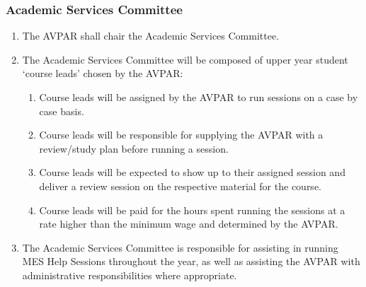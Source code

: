 \subsubsection{Academic Services Committee}
\label{academic-services-committee}
\begin{enumerate}
 \item
  The AVPAR shall chair the Academic Services Committee.
 \item
  The Academic Services Committee will be composed of upper year student
  `course leads' chosen by the AVPAR:

  \begin{enumerate}
   \item
    Course leads will be assigned by the AVPAR to run sessions on a case
    by case basis.
   \item
    Course leads will be responsible for supplying the AVPAR with a
    review/study plan before running a session.
   \item
    Course leads will be expected to show up to their assigned session
    and deliver a review session on the respective material for the
    course.
   \item
    Course leads will be paid for the hours spent running the sessions
    at a rate higher than the minimum wage and determined by the AVPAR.
  \end{enumerate}
 \item
  The Academic Services Committee is responsible for assisting in
  running MES Help Sessions throughout the year, as well as assisting
  the AVPAR with administrative responsibilities where appropriate.

\end{enumerate}

